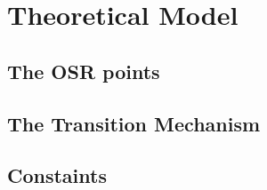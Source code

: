 
\chapter{Theoretical Model} %

\label{Chapter3} %


\newcommand{\keyword}[1]{\textbf{#1}}
\newcommand{\tabhead}[1]{\textbf{#1}}
\newcommand{\code}[1]{\texttt{#1}}
\newcommand{\file}[1]{\texttt{\bfseries#1}}
\newcommand{\option}[1]{\texttt{\itshape#1}}



\section{The OSR points}
\section{The Transition Mechanism}
\section{Constaints}